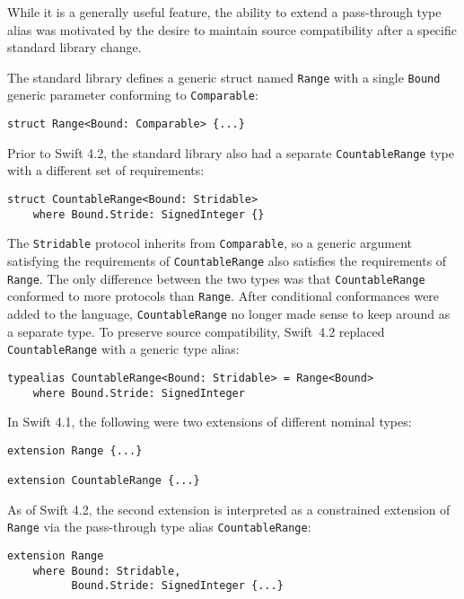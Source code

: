 \documentclass[../generics]{subfiles}
\begin{document}
\begin{example}
While it is a generally useful feature, the ability to extend a pass-through type alias was motivated by the desire to maintain source compatibility after a specific standard library change.

The standard library defines a generic struct named \texttt{Range} with a single \texttt{Bound} generic parameter conforming to \texttt{Comparable}:
\begin{Verbatim}
struct Range<Bound: Comparable> {...}
\end{Verbatim}
Prior to Swift 4.2, the standard library also had a separate \texttt{CountableRange} type with a different set of requirements:
\begin{Verbatim}
struct CountableRange<Bound: Stridable>
    where Bound.Stride: SignedInteger {}
\end{Verbatim}
The \texttt{Stridable} protocol inherits from \texttt{Comparable}, so a generic argument satisfying the requirements of \texttt{CountableRange} also satisfies the requirements of \texttt{Range}. The only difference between the two types was that \texttt{CountableRange} conformed to more protocols than \texttt{Range}. After conditional conformances were added to the language, \texttt{CountableRange} no longer made sense to keep around as a separate type. To preserve source compatibility, Swift~4.2 replaced \texttt{CountableRange} with a generic type alias:
\begin{Verbatim}
typealias CountableRange<Bound: Stridable> = Range<Bound>
    where Bound.Stride: SignedInteger
\end{Verbatim}
In Swift 4.1, the following were two extensions of different nominal types:
\begin{Verbatim}
extension Range {...}

extension CountableRange {...}
\end{Verbatim}
As of Swift 4.2, the second extension is interpreted as a constrained extension of \texttt{Range} via the pass-through type alias \texttt{CountableRange}:
\begin{Verbatim}
extension Range
    where Bound: Stridable,
          Bound.Stride: SignedInteger {...}
\end{Verbatim}
\end{example}
\end{document}
